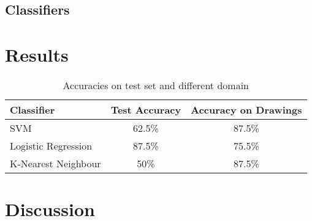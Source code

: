 \documentclass[10pt, a4paper]{article}
\begin{document}
\subsection{Classifiers}
\section{Results}
\begin{table}[h]
  \centering
  \caption{Best training parameters \& results}
  \label{fig:TrainAcc}
\end{table}

\begin{table}[h]
  \centering
    \begin{tabular}{l|cc}
    Classifier          & Test Accuracy & Accuracy on Drawings \\\hline
    SVM                 & 62.5\%        & 87.5\%               \\
    Logistic Regression & 87.5\%        & 75.5\%               \\
    K-Nearest Neighbour & 50\%          & 87.5\%              
    \end{tabular}
  \caption{Accuracies on test set and different domain}
  \label{fig:testDomainAcc}
\end{table}
\section{Discussion}
\clearpage


\nocite{*}
\end{document}
